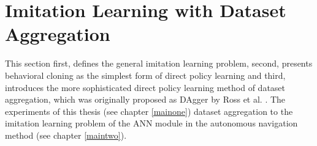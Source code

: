 \section{Imitation Learning with Dataset Aggregation} \label{sec:imitation_learning}

\newcommand{\parentheses}[1]{\left({#1}\right)}
\newcommand{\brackets}[1]{\left[{#1}\right]}
\newcommand{\braces}[1]{\left\{{#1}\right\}}

\newcommand{\timestep}{t}
\newcommand{\state}{\underline{x}}
\newcommand{\stateDomain}{\mathcal{X}}
\newcommand{\action}{\underline{u}}
\newcommand{\actionDomain}{\mathcal{U}}
\newcommand{\probability}{p}

\newcommand{\policy}{\pi}
\newcommand{\demonstration}{\xi}
\newcommand{\expertt}{*}
\newcommand{\parameterVector}{\underline{\theta}}
\newcommand{\trajectory}{\tau}

This section first, defines the general imitation learning problem, 
second, presents behavioral cloning as the simplest form of direct policy learning 
and third, introduces the more sophisticated direct policy learning method 
of dataset aggregation, 
which was originally proposed as DAgger by Ross et al. \cite{Ross2010}.
The experiments of this thesis (see chapter \ref{mainone}) 
dataset aggregation to the imitation learning problem 
of the ANN module in the autonomous navigation method (see chapter \ref{maintwo}). 



